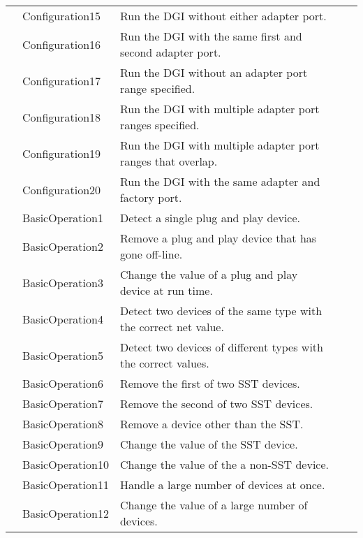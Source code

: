 \documentclass{article}
\newcounter{rownum}
\newcommand\rownumber{\stepcounter{rownum}\arabic{rownum}}
\begin{document}
\begin{longtable}{|c|p{4cm}|p{5cm}|c|p{6cm}|}
    \rownumber & Configuration15 & Run the DGI without either adapter port.
               & & \\
    \rownumber & Configuration16 & Run the DGI with the same first and second adapter port.
               & & \\
    \rownumber & Configuration17 & Run the DGI without an adapter port range specified.
               & & \\
    \rownumber & Configuration18 & Run the DGI with multiple adapter port ranges specified.
               & & \\
    \rownumber & Configuration19 & Run the DGI with multiple adapter port ranges that overlap.
               & & \\
    \rownumber & Configuration20 & Run the DGI with the same adapter and factory port.
               & & \\
    \rownumber & BasicOperation1 & Detect a single plug and play device.
               & & \\
    \rownumber & BasicOperation2 & Remove a plug and play device that has gone off-line.
               & & \\
    \rownumber & BasicOperation3 & Change the value of a plug and play device at run time.
               & & \\
    \rownumber & BasicOperation4 & Detect two devices of the same type with the correct net value.
               & & \\
    \rownumber & BasicOperation5 & Detect two devices of different types with the correct values.
               & & \\
    \rownumber & BasicOperation6 & Remove the first of two SST devices.
               & & \\
    \rownumber & BasicOperation7 & Remove the second of two SST devices.
               & & \\
    \rownumber & BasicOperation8 & Remove a device other than the SST.
               & & \\
    \rownumber & BasicOperation9 & Change the value of the SST device.
               & & \\
    \rownumber & BasicOperation10 & Change the value of the a non-SST device.
               & & \\
    \rownumber & BasicOperation11 & Handle a large number of devices at once.
               & & \\
    \rownumber & BasicOperation12 & Change the value of a large number of devices.
               & & \\

\end{longtable}
\end{document}
